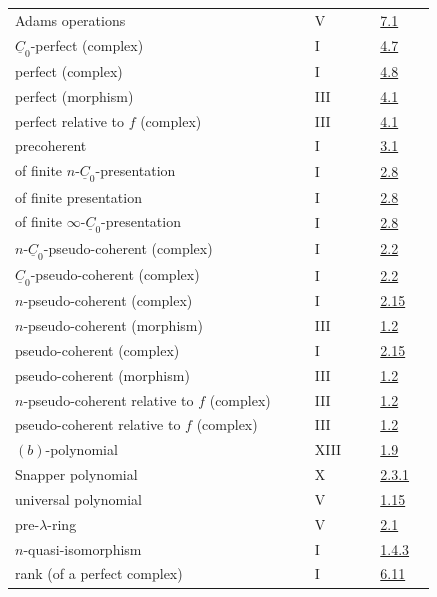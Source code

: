 \begin{longtable}{@{}>{\raggedright\arraybackslash}p{0.64\linewidth}>{\raggedright\arraybackslash}p{0.14\linewidth}>{\raggedright\arraybackslash}p{0.12\linewidth}@{}}
Adams operations & V & \hyperlink{sga6.e05.para.7-1}{7.1}\\
\(\underline{C}_0\)-perfect (complex) & I & \hyperlink{sga6.e01.def.4-7}{4.7}\\
perfect (complex) & I & \hyperlink{sga6.e01.ex.4-8}{4.8}\\
perfect (morphism) & III & \hyperlink{sga6.e03.def.4-1}{4.1}\\
perfect relative to \(f\) (complex) & III & \hyperlink{sga6.e03.def.4-1}{4.1}\\
precoherent & I & \hyperlink{sga6.e01.def.3-1}{3.1}\\
of finite \(n\)-\(\underline{C}_0\)-presentation & I & \hyperlink{sga6.e01.def.2-8}{2.8}\\
of finite presentation & I & \hyperlink{sga6.e01.def.2-8}{2.8}\\
of finite \(\infty\)-\(\underline{C}_0\)-presentation & I & \hyperlink{sga6.e01.def.2-8}{2.8}\\
\(n\)-\(\underline{C}_0\)-pseudo-coherent (complex) & I & \hyperlink{sga6.e01.prop.2-2}{2.2}\\
\(\underline{C}_0\)-pseudo-coherent (complex) & I & \hyperlink{sga6.e01.prop.2-2}{2.2}\\
\(n\)-pseudo-coherent (complex) & I & \hyperlink{sga6.e01.ex.2-15}{2.15}\\
\(n\)-pseudo-coherent (morphism) & III & \hyperlink{sga6.e03.def.1-2}{1.2}\\
pseudo-coherent (complex) & I & \hyperlink{sga6.e01.ex.2-15}{2.15}\\
pseudo-coherent (morphism) & III & \hyperlink{sga6.e03.def.1-2}{1.2}\\
\(n\)-pseudo-coherent relative to \(f\) (complex) & III & \hyperlink{sga6.e03.def.1-2}{1.2}\\
pseudo-coherent relative to \(f\) (complex) & III & \hyperlink{sga6.e03.def.1-2}{1.2}\\
\((b)\)-polynomial & XIII & \hyperlink{sga6.e13.def.1-9}{1.9}\\
Snapper polynomial & X & \hyperlink{sga6.e10.prop.2-3-1}{2.3.1}\\
universal polynomial & V & \hyperlink{sga6.e05.para.1-15}{1.15}\\
pre-\(\lambda\)-ring & V & \hyperlink{sga6.e05.def.2-1}{2.1}\\
\(n\)-quasi-isomorphism & I & \hyperlink{sga6.e01.def.1-4-3}{1.4.3}\\
rank (of a perfect complex) & I & \hyperlink{sga6.e01.def.6-11}{6.11}\\

\end{longtable}
